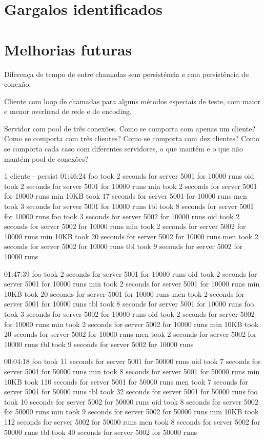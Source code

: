 \documentclass[11pt]{article}
\begin{document}
\section{Gargalos identificados}\label{sec:bottle}

\section{Melhorias futuras}\label{sec:future}

Diferença de tempo de entre chamadas sem persistência e com persistência de
conexão.

Cliente com loop de chamadas para alguns métodos especiais de teste, com maior
e menor overhead de rede e de encoding.

Servidor com pool de três conexões.
Como se comporta com apenas um cliente?
Como se comporta com três clientes?
Como se comporta com dez clientes?
Como se comporta cada caso com diferentes servidores, o que mantém e o que não
mantém pool de conexões?


 1 cliente - persist
01:46:24
foo took 2 seconds for server 5001 for 10000 runs
oid took 2 seconds for server 5001 for 10000 runs
min took 2 seconds for server 5001 for 10000 runs
min 10KB took 17 seconds for server 5001 for 10000 runs
men took 3 seconds for server 5001 for 10000 runs
tbl took 8 seconds for server 5001 for 10000 runs
foo took 3 seconds for server 5002 for 10000 runs
oid took 2 seconds for server 5002 for 10000 runs
min took 2 seconds for server 5002 for 10000 runs
min 10KB took 20 seconds for server 5002 for 10000 runs
men took 2 seconds for server 5002 for 10000 runs
tbl took 9 seconds for server 5002 for 10000 runs

01:47:39
foo took 2 seconds for server 5001 for 10000 runs
oid took 2 seconds for server 5001 for 10000 runs
min took 2 seconds for server 5001 for 10000 runs
min 10KB took 20 seconds for server 5001 for 10000 runs
men took 2 seconds for server 5001 for 10000 runs
tbl took 8 seconds for server 5001 for 10000 runs
foo took 3 seconds for server 5002 for 10000 runs
oid took 2 seconds for server 5002 for 10000 runs
min took 2 seconds for server 5002 for 10000 runs
min 10KB took 20 seconds for server 5002 for 10000 runs
men took 2 seconds for server 5002 for 10000 runs
tbl took 9 seconds for server 5002 for 10000 runs


00:04:18
foo took 11 seconds for server 5001 for 50000 runs
oid took 7 seconds for server 5001 for 50000 runs
min took 8 seconds for server 5001 for 50000 runs
min 10KB took 110 seconds for server 5001 for 50000 runs
men took 7 seconds for server 5001 for 50000 runs
tbl took 32 seconds for server 5001 for 50000 runs
foo took 10 seconds for server 5002 for 50000 runs
oid took 8 seconds for server 5002 for 50000 runs
min took 9 seconds for server 5002 for 50000 runs
min 10KB took 112 seconds for server 5002 for 50000 runs
men took 8 seconds for server 5002 for 50000 runs
tbl took 40 seconds for server 5002 for 50000 runs
\end{document}
